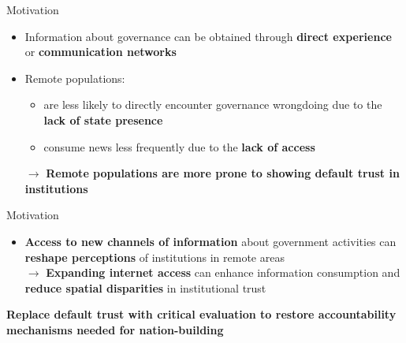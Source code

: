 \documentclass[10pt]{beamer}
\begin{document}
\begin{frame}{Motivation}
        \begin{itemize}\vspace{0.5em}
            \item Information about governance can be obtained through \textbf{direct experience} or \textbf{communication networks}\vspace{0.5em}
            \item Remote populations:\\
            \begin{itemize}
            \item are less likely to directly encounter governance wrongdoing due to the \textbf{lack of state presence}\vspace{0.5em}
            \item consume news less frequently due to the \textbf{lack of access}\\ \vspace{1em}
            \end{itemize}
            $\rightarrow$ \textcolor{rougeprez}{\textbf{Remote populations are more prone to showing default trust in institutions}} 
         \end{itemize}

\end{frame}
\begin{frame}{Motivation}
    \centering\vspace{1em}
    \begin{itemize}\setlength\itemsep{1em}
    \item \textbf{Access to new channels of information} about government activities can \textbf{reshape perceptions} of institutions in remote areas\\ \vspace{0.5em}
    $\rightarrow{}$ \textbf{Expanding internet access} can enhance information consumption and \textbf{reduce spatial disparities} in institutional trust
    \end{itemize}\vspace{3em}
    \centering {}\textcolor{rougeprez}{\textbf{Replace default trust with critical evaluation to restore accountability mechanisms needed for nation-building}}
\end{frame}
\end{document}
